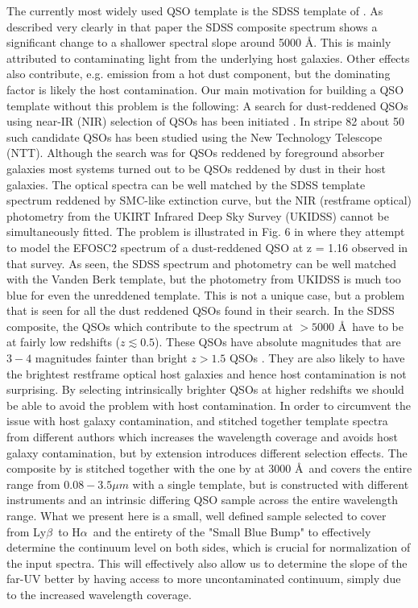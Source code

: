 \documentclass{aa}    %
\newcommand{\lyb}{Ly$\beta$}
\newcommand{\ha}{H$\alpha$}
\begin{document}
The currently most widely used QSO template is the SDSS template of
\citet{VandenBerk2001}. As described very clearly in that paper the
SDSS composite spectrum shows a significant change to a shallower
spectral slope around 5000 \AA. This is mainly attributed to
contaminating light from the underlying host galaxies. Other effects
also contribute, e.g. emission from a hot dust component, but the
dominating factor is likely the host contamination. Our main
motivation for building a QSO template without this problem is the
following: A search for dust-reddened QSOs using
near-IR (NIR) selection of QSOs has been initiated \citep{Fynbo2013, Krogager2015}. In
stripe 82 about 50 such candidate QSOs has been studied using the
New Technology Telescope (NTT). Although the search was for QSOs reddened by foreground absorber
galaxies most systems turned out to be QSOs reddened by dust in their
host galaxies. The optical spectra can be well matched by the SDSS
template spectrum reddened by SMC-like extinction curve, but the NIR
(restframe optical) photometry from the UKIRT Infrared Deep Sky Survey (UKIDSS) cannot be simultaneously
fitted. The problem is illustrated in Fig. 6 in \citet{Fynbo2013}
where they attempt to model the EFOSC2 spectrum of a dust-reddened QSO
at z = 1.16 observed in that survey. As seen, the SDSS spectrum and
photometry can be well matched with the Vanden Berk template, but the
photometry from UKIDSS is much too blue for even the unreddened
template. This is not a unique case, but a problem that is seen for
all the dust reddened QSOs found in their search.  In the SDSS
composite, the QSOs which contribute to the spectrum at $ > 5000$
\AA~have to be at fairly low redshifts ($z \lesssim 0.5$). These QSOs
have absolute magnitudes that are $3-4$ magnitudes fainter than bright
$z > 1.5$ QSOs \citep[e.g.,][their Fig.~1]{VandenBerk2001}. They are
also likely to have the brightest restframe optical host galaxies and
hence host contamination is not surprising. By selecting intrinsically
brighter QSOs at higher redshifts we should be able to avoid the
problem with host contamination.  In order to circumvent the issue
with host galaxy contamination, \citet{Fynbo2013} and
\citet{Krogager2015} stitched together template spectra from different
authors which increases the wavelength coverage and avoids host galaxy
contamination, but by extension introduces different selection
effects. The composite by \citet{Glikman2006} is stitched together
with the one by \citet{VandenBerk2001} at $3000$ \AA~and covers the
entire range from $0.08 - 3.5 \mu m$ with a single template, but is
constructed with different instruments and an intrinsic differing QSO
sample across the entire wavelength range.  What we present here is a
small, well defined sample selected to cover from \lyb~to \ha~and the
entirety of the "Small Blue Bump" to effectively determine the
continuum level on both sides, which is crucial for normalization of
the input spectra. This will effectively also allow us to determine
the slope of the far-UV better by having access to more uncontaminated
continuum, simply due to the increased wavelength coverage.
\end{document}
